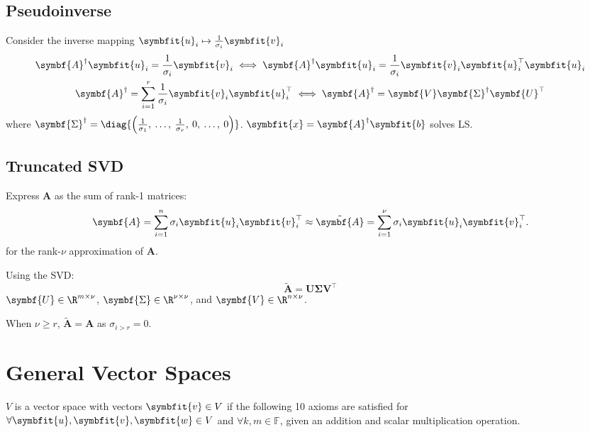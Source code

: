 \documentclass{article}
\begin{document}
\begin{multicols*}{3}
    \subsection{Pseudoinverse}
    Consider the inverse mapping \(\symbfit{u}_i \mapsto \frac{1}{\sigma_i} \symbfit{v}_i\)
    \begin{gather*}
        \symbf{A}^\dagger \symbfit{u}_i = \frac{1}{\sigma_i} \symbfit{v}_i
        \iff
        \symbf{A}^\dagger \symbfit{u}_i = \frac{1}{\sigma_i} \symbfit{v}_i \symbfit{u}^\top_i \symbfit{u}_i \\
        \symbf{A}^\dagger = \sum_{i = 1}^r \frac{1}{\sigma_i} \symbfit{v}_i \symbfit{u}^\top_i
        \iff
        \symbf{A}^\dagger = \symbf{V} \symbf{\Sigma}^\dagger \symbf{U}^\top
    \end{gather*}
    where \(\symbf{\Sigma}^\dagger = \diag{\left( \frac{1}{\sigma_1},\: \dots,\: \frac{1}{\sigma_r},\: 0,\: \dots,\: 0 \right)}\).
    \(\symbfit{x} = \symbf{A}^\dagger \symbfit{b}\) solves LS\@.
    \subsection{Truncated SVD}
    Express \(\symbf{A}\) as the sum of rank-1 matrices:
    \begin{equation*}
        \symbf{A} = \sum_{i = 1}^n \sigma_i \symbfit{u}_i \symbfit{v}^\top_i \approx \tilde{\symbf{A}} = \sum_{i = 1}^\nu \sigma_i \symbfit{u}_i \symbfit{v}^\top_i.
    \end{equation*}
    for the rank-\(\nu\) approximation of \(\symbf{A}\).

    Using the SVD\@:
    \begin{equation*}
        \tilde{\symbf{A}} = \symbf{U} \symbf{\Sigma} \symbf{V}^\top
    \end{equation*}
    \(\symbf{U} \in \R^{m \times \nu}\), \(\symbf{\Sigma} \in \R^{\nu \times \nu}\), and \(\symbf{V} \in \R^{n \times \nu}\).

    When \(\nu \geq r\), \(\tilde{\symbf{A}} = \symbf{A}\) as \(\sigma_{i > r} = 0\).
    \section{General Vector Spaces}
    \(V\) is a vector space with vectors \(\symbfit{v} \in V\) if the following 10 axioms are satisfied
    for \(\forall \symbfit{u}, \symbfit{v}, \symbfit{w} \in V\) and \(\forall k, m \in \mathbb{F}\),
    given an addition and scalar multiplication operation.


\end{multicols*}
\end{document}
